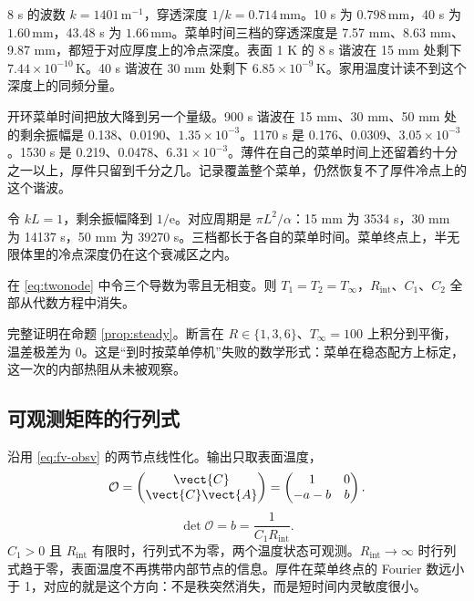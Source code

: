 8 s 的波数 \(k=1401\,\mathrm{m}^{-1}\)，穿透深度 \(1/k=0.714\,\mathrm{mm}\)。10 s 为 \(0.798\,\mathrm{mm}\)，40 s 为 \(1.60\,\mathrm{mm}\)，43.48 s 为 \(1.66\,\mathrm{mm}\)。菜单时间三档的穿透深度是 7.57 mm、8.63 mm、9.87 mm，都短于对应厚度上的冷点深度。表面 1 K 的 8 s 谐波在 15 mm 处剩下 \(7.44\times 10^{-10}\,\mathrm{K}\)。40 s 谐波在 30 mm 处剩下 \(6.85\times 10^{-9}\,\mathrm{K}\)。家用温度计读不到这个深度上的同频分量。

开环菜单时间把放大降到另一个量级。900 s 谐波在 15 mm、30 mm、50 mm 处的剩余振幅是 0.138、0.0190、\(1.35\times 10^{-3}\)。1170 s 是 0.176、0.0309、\(3.05\times 10^{-3}\)。1530 s 是 0.219、0.0478、\(6.31\times 10^{-3}\)。薄件在自己的菜单时间上还留着约十分之一以上，厚件只留到千分之几。记录覆盖整个菜单，仍然恢复不了厚件冷点上的这个谐波。

令 \(kL=1\)，剩余振幅降到 \(1/\mathrm{e}\)。对应周期是 \(\pi L^2/\alpha\)：15 mm 为 3534 s，30 mm 为 14137 s，50 mm 为 39270 s。三档都长于各自的菜单时间。菜单终点上，半无限体里的冷点深度仍在这个衰减区之内。

\begin{proposition}[静态观测不足以分离内外热阻]
在 \eqref{eq:twonode} 中令三个导数为零且无相变。则 \(T_1=T_2=T_\infty\)，\(R_{\mathrm{int}}\)、\(C_1\)、\(C_2\) 全部从代数方程中消失。
\end{proposition}

完整证明在命题 \ref{prop:steady}。断言在 \(R\in\{1,3,6\}\)、\(T_\infty=100\) 上积分到平衡，温差极差为 0。这是“到时按菜单停机”失败的数学形式：菜单在稳态配方上标定，这一次的内部热阻从未被观察。

\subsection{可观测矩阵的行列式}

沿用 \eqref{eq:fv-obsv} 的两节点线性化。输出只取表面温度，
\[
\mathcal{O}=\begin{pmatrix}\vect{C}\\ \vect{C}\vect{A}\end{pmatrix}
=\begin{pmatrix}1&0\\ -a-b& b\end{pmatrix}.
\]
\[
\det\mathcal{O}=b=\frac{1}{C_1 R_{\mathrm{int}}}.
\]
\(C_1>0\) 且 \(R_{\mathrm{int}}\) 有限时，行列式不为零，两个温度状态可观测。\(R_{\mathrm{int}}\to\infty\) 时行列式趋于零，表面温度不再携带内部节点的信息。厚件在菜单终点的 Fourier 数远小于 1，对应的就是这个方向：不是秩突然消失，而是短时间内灵敏度很小。

